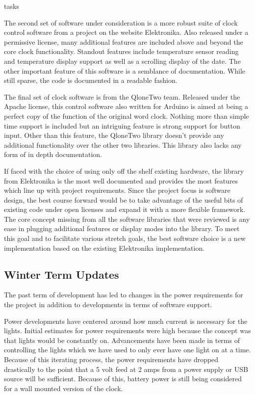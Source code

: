 tasks\documentclass[onecolumn, draftclsnofoot,10pt, compsoc]{IEEEtran}
\begin{document}
The second set of software under consideration is a more robust suite of clock control software from a project on the website Elektronika.
Also released under a permissive license, many additional features are included above and beyond the core clock functionality. \cite{software2}
Standout features include temperature sensor reading and temperature display support as well as a scrolling display of the date.
The other important feature of this software is a semblance of documentation.
While still sparse, the code is documented in a readable fashion.

The final set of clock software is from the QloneTwo team.
Released under the Apache license, this control software also written for Arduino is aimed at being a perfect copy of the function of the original word clock.
Nothing more than simple time support is included but an intriguing feature is strong support for button input. \cite{software3}
Other than this feature, the QloneTwo library doesn’t provide any additional functionality over the other two libraries.
This library also lacks any form of in depth documentation.

If faced with the choice of using only off the shelf existing hardware, the library from Elektronika is the most well documented and provides the most features which line up with project requirements.
Since the project focus is software design, the best course forward would be to take advantage of the useful bits of existing code under open licenses and expand it with a more flexible framework.
The core concept missing from all the software libraries that were reviewed is any ease in plugging additional features or display modes into the library.
To meet this goal and to facilitate various stretch goals, the best software choice is a new implementation based on the existing Elektronika implementation.

\subsection{Winter Term Updates}
The past term of development has led to changes in the power requirements for the project in addition to developments in terms of software support.

Power developments have centered around how much current is necessary for the lights.
Initial estimates for power requirements were high because the concept was that lights would be constantly on.
Advancements have been made in terms of controlling the lights which we have used to only ever have one light on at a time.
Because of this iterating process, the power requirements have dropped drastically to the point that a 5 volt feed at 2 amps from a power supply or USB source will be sufficient.
Because of this, battery power is still being considered for a wall mounted version of the clock.
\end{document}
